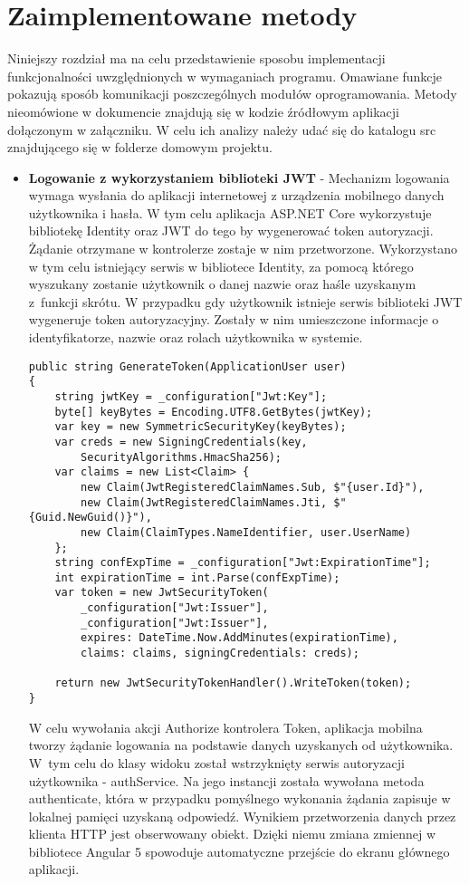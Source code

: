 \section{Zaimplementowane metody}
Niniejszy rozdział ma na celu przedstawienie sposobu implementacji funkcjonalności uwzględnionych w wymaganiach programu. Omawiane funkcje pokazują sposób komunikacji poszczególnych modułów oprogramowania. Metody nieomówione w dokumencie znajdują się w kodzie źródłowym aplikacji dołączonym w załączniku. W celu ich analizy należy udać się do katalogu src znajdującego się w folderze domowym projektu.
\\
\begin{itemize}
\item \textbf{Logowanie z wykorzystaniem biblioteki JWT} - Mechanizm logowania wymaga wysłania do aplikacji internetowej z urządzenia mobilnego danych użytkownika i hasła. W tym celu aplikacja ASP.NET Core wykorzystuje bibliotekę Identity oraz JWT do tego by wygenerować token autoryzacji. Żądanie otrzymane w kontrolerze zostaje w nim przetworzone. Wykorzystano w tym celu istniejący serwis w bibliotece Identity, za pomocą którego wyszukany zostanie użytkownik o danej nazwie oraz haśle uzyskanym z~funkcji skrótu. W przypadku gdy użytkownik istnieje serwis biblioteki JWT wygeneruje token autoryzacyjny. Zostały w nim umieszczone informacje o identyfikatorze, nazwie oraz rolach użytkownika w systemie.

\begin{lstlisting}[caption=Metoda generująca token JWT.]
 public string GenerateToken(ApplicationUser user)
{
	string jwtKey = _configuration["Jwt:Key"];
	byte[] keyBytes = Encoding.UTF8.GetBytes(jwtKey);
	var key = new SymmetricSecurityKey(keyBytes);
	var creds = new SigningCredentials(key,
		SecurityAlgorithms.HmacSha256);
	var claims = new List<Claim> {
		new Claim(JwtRegisteredClaimNames.Sub, $"{user.Id}"),
		new Claim(JwtRegisteredClaimNames.Jti, $"{Guid.NewGuid()}"),
		new Claim(ClaimTypes.NameIdentifier, user.UserName)
	};
	string confExpTime = _configuration["Jwt:ExpirationTime"];
	int expirationTime = int.Parse(confExpTime);
	var token = new JwtSecurityToken(
		_configuration["Jwt:Issuer"],
		_configuration["Jwt:Issuer"],
		expires: DateTime.Now.AddMinutes(expirationTime),
		claims: claims, signingCredentials: creds);
	
	return new JwtSecurityTokenHandler().WriteToken(token);
}
\end{lstlisting} 

W celu wywołania akcji Authorize kontrolera Token, aplikacja mobilna tworzy żądanie logowania na podstawie danych uzyskanych od użytkownika. W~tym celu do klasy widoku został wstrzyknięty serwis autoryzacji użytkownika - authService. Na jego instancji została wywołana metoda authenticate, która w przypadku pomyślnego wykonania żądania zapisuje w lokalnej pamięci uzyskaną odpowiedź. Wynikiem przetworzenia danych przez klienta HTTP jest obserwowany obiekt. Dzięki niemu zmiana zmiennej w bibliotece Angular 5 spowoduje automatyczne przejście do ekranu głównego aplikacji.


\end{itemize}
